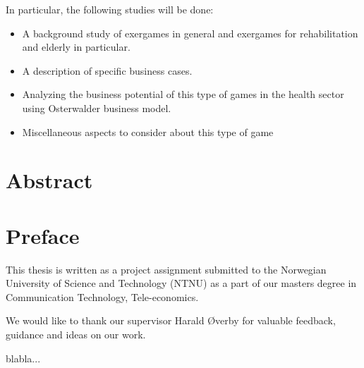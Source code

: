 \documentclass[b5paper,twoside,openright,11pt]{report}
\begin{document}
In particular, the following studies will be done: 
\begin{itemize}
\renewcommand{\labelitemi}{$\bullet$}
\item A background study of exergames in general and exergames for rehabilitation and elderly in particular.
\item	A description of specific business cases.
\item	Analyzing the business potential of this type of games in the health sector using Osterwalder business model.
\item	Miscellaneous aspects to consider about this type of game
\end{itemize}
\cleardoublepage
\chapter*{Abstract}
\cleardoublepage
\chapter*{Preface}
This thesis is written as a project assignment submitted to the Norwegian University of Science and Technology (NTNU) as a part of our masters degree in Communication Technology, Tele-economics.  

We would like to thank our supervisor Harald Øverby for valuable feedback, guidance and ideas on our work.     

blabla...
\cleardoublepage
{}
\tableofcontents
\cleardoublepage

\cleardoublepage
\listoffigures
\cleardoublepage
\listoftables
\cleardoublepage
{}

\cleardoublepage

\cleardoublepage

\cleardoublepage

\cleardoublepage

\cleardoublepage

\cleardoublepage

\cleardoublepage

\cleardoublepage

\cleardoublepage


\cleardoublepage

\end{document}
